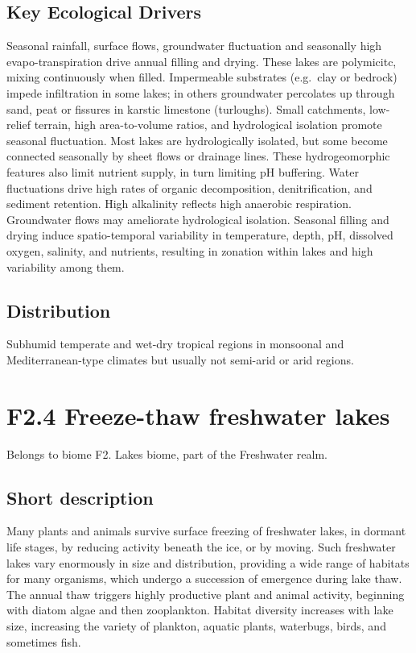\documentclass[
  letterpaper,
  DIV=11,
  numbers=noendperiod]{scrartcl}
\begin{document}
\subsection{Key Ecological Drivers}\label{key-ecological-drivers-119}

Seasonal rainfall, surface flows, groundwater fluctuation and seasonally
high evapo-transpiration drive annual filling and drying. These lakes
are polymicitc, mixing continuously when filled. Impermeable substrates
(e.g.~clay or bedrock) impede infiltration in some lakes; in others
groundwater percolates up through sand, peat or fissures in karstic
limestone (turloughs). Small catchments, low-relief terrain, high
area-to-volume ratios, and hydrological isolation promote seasonal
fluctuation. Most lakes are hydrologically isolated, but some become
connected seasonally by sheet flows or drainage lines. These
hydrogeomorphic features also limit nutrient supply, in turn limiting pH
buffering. Water fluctuations drive high rates of organic decomposition,
denitrification, and sediment retention. High alkalinity reflects high
anaerobic respiration. Groundwater flows may ameliorate hydrological
isolation. Seasonal filling and drying induce spatio-temporal
variability in temperature, depth, pH, dissolved oxygen, salinity, and
nutrients, resulting in zonation within lakes and high variability among
them.

\subsection{Distribution}\label{distribution-119}

Subhumid temperate and wet-dry tropical regions in monsoonal and
Mediterranean-type climates but usually not semi-arid or arid regions.

\section{F2.4 Freeze-thaw freshwater
lakes}\label{f2.4-freeze-thaw-freshwater-lakes-1}

Belongs to biome F2. Lakes biome, part of the Freshwater realm.

\subsection{Short description}\label{short-description-120}

Many plants and animals survive surface freezing of freshwater lakes, in
dormant life stages, by reducing activity beneath the ice, or by moving.
Such freshwater lakes vary enormously in size and distribution,
providing a wide range of habitats for many organisms, which undergo a
succession of emergence during lake thaw. The annual thaw triggers
highly productive plant and animal activity, beginning with diatom algae
and then zooplankton. Habitat diversity increases with lake size,
increasing the variety of plankton, aquatic plants, waterbugs, birds,
and sometimes fish.
\end{document}
